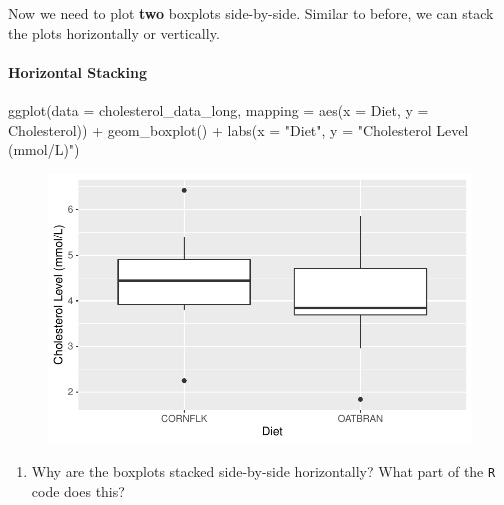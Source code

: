 \documentclass[
  letterpaper,
  DIV=11,
  numbers=noendperiod]{scrartcl}
\let\oldparagraph\paragraph
\renewcommand{\paragraph}[1]{\oldparagraph{#1}\mbox{}}
\newenvironment{Shaded}{\begin{snugshade}}{\end{snugshade}}
\newcommand{\AttributeTok}[1]{\textcolor[rgb]{0.40,0.45,0.13}{#1}}
\newcommand{\FunctionTok}[1]{\textcolor[rgb]{0.28,0.35,0.67}{#1}}
\newcommand{\NormalTok}[1]{\textcolor[rgb]{0.00,0.23,0.31}{#1}}
\newcommand{\SpecialCharTok}[1]{\textcolor[rgb]{0.37,0.37,0.37}{#1}}
\newcommand{\StringTok}[1]{\textcolor[rgb]{0.13,0.47,0.30}{#1}}
\providecommand{\tightlist}{%
  \setlength{\itemsep}{0pt}\setlength{\parskip}{0pt}}\usepackage{longtable,booktabs,array}
\begin{document}
Now we need to plot \textbf{two} boxplots side-by-side. Similar to
before, we can stack the plots horizontally or vertically.

\hypertarget{horizontal-stacking}{%
\paragraph{Horizontal Stacking}\label{horizontal-stacking}}

\begin{Shaded}
\begin{Highlighting}[]
\FunctionTok{ggplot}\NormalTok{(}\AttributeTok{data =}\NormalTok{ cholesterol\_data\_long, }
       \AttributeTok{mapping =} \FunctionTok{aes}\NormalTok{(}\AttributeTok{x =}\NormalTok{ Diet, }\AttributeTok{y =}\NormalTok{ Cholesterol)) }\SpecialCharTok{+}
  \FunctionTok{geom\_boxplot}\NormalTok{() }\SpecialCharTok{+}
  \FunctionTok{labs}\NormalTok{(}\AttributeTok{x =} \StringTok{"Diet"}\NormalTok{, }
       \AttributeTok{y =} \StringTok{"Cholesterol Level (mmol/L)"}\NormalTok{)}
\end{Highlighting}
\end{Shaded}

\begin{figure}[H]

{\centering \includegraphics{activity5-cholesterol-I-key_files/figure-pdf/horizontal-box-1.pdf}

}

\end{figure}

\begin{enumerate}
\def\labelenumi{\arabic{enumi}.}
\setcounter{enumi}{9}
\tightlist
\item
  Why are the boxplots stacked side-by-side horizontally? What part of
  the \texttt{R} code does this?
\end{enumerate}
\end{document}
